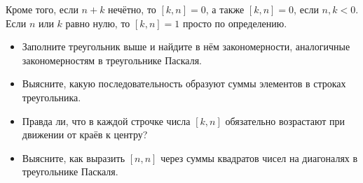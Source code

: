Кроме того, если $n+k$ нечётно, то $[k,n] = 0$, а также $[k,n] = 0$, если $n,k < 0$. Если $n$ или $k$ равно нулю, то $[k,n] = 1$ просто по определению.
\begin{itemize}
\item Заполните треугольник выше и найдите в нём закономерности, аналогичные закономерностям в треугольнике Паскаля.
\item Выясните, какую последовательность образуют суммы элементов в строках треугольника.
\item Правда ли, что в каждой строчке числа $[k,n]$ обязательно возрастают при движении от краёв к центру?
\item Выясните, как выразить $[n,n]$ через суммы квадратов чисел на диагоналях в треугольнике Паскаля.
\end{itemize}